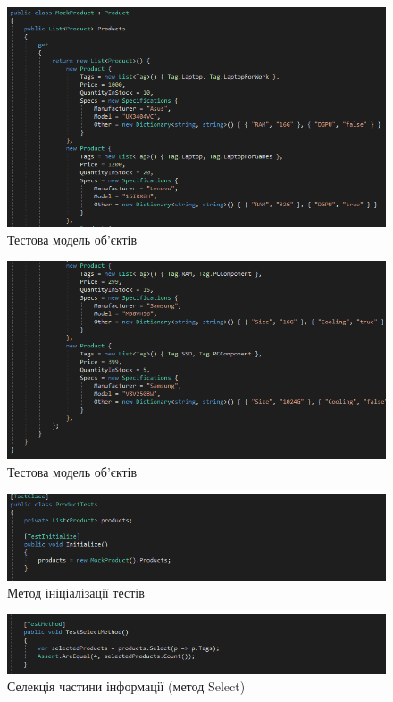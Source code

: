 \documentclass[oneside,14pt]{extarticle}
\begin{document}
\begin{normalsize}
	\begin{figure}[H]
		\centering
		\includegraphics[width=\textwidth]{22}
		\caption{Тестова модель об'єктів}
	\end{figure}
	\begin{figure}[H]
		\centering
		\includegraphics[width=\textwidth]{222}
		\caption{Тестова модель об'єктів}
	\end{figure}

	\begin{figure}[H]
		\centering
		\includegraphics[width=\textwidth]{01}
		\caption{Метод ініціалізації тестів}
	\end{figure}


	\begin{figure}[H]
		\centering
		\includegraphics[width=\textwidth]{1}
		\caption{Селекція частини інформації (метод Select)}
	\end{figure}


\end{normalsize}
\end{document}
